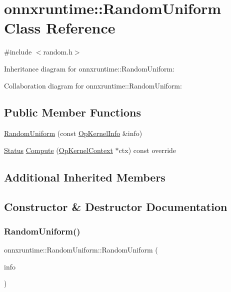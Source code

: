 \hypertarget{classonnxruntime_1_1RandomUniform}{}\section{onnxruntime\+:\+:Random\+Uniform Class Reference}
\label{classonnxruntime_1_1RandomUniform}


{\ttfamily \#include $<$random.\+h$>$}



Inheritance diagram for onnxruntime\+:\+:Random\+Uniform\+:


Collaboration diagram for onnxruntime\+:\+:Random\+Uniform\+:
\subsection*{Public Member Functions}
\begin{DoxyCompactItemize}
\item 
\mbox{\hyperlink{classonnxruntime_1_1RandomUniform_a239c67def4d44477f9b9de071d57bc5a}{Random\+Uniform}} (const \mbox{\hyperlink{classonnxruntime_1_1OpKernelInfo}{Op\+Kernel\+Info}} \&info)
\item 
\mbox{\hyperlink{classonnxruntime_1_1common_1_1Status}{Status}} \mbox{\hyperlink{classonnxruntime_1_1RandomUniform_a5a7d183518814aa5f09a31bb8188a290}{Compute}} (\mbox{\hyperlink{classonnxruntime_1_1OpKernelContext}{Op\+Kernel\+Context}} $\ast$ctx) const override
\end{DoxyCompactItemize}
\subsection*{Additional Inherited Members}


\subsection{Constructor \& Destructor Documentation}
\mbox{\label{classonnxruntime_1_1RandomUniform_a239c67def4d44477f9b9de071d57bc5a}} 
\subsubsection{\texorpdfstring{Random\+Uniform()}{RandomUniform()}}
{\footnotesize\ttfamily onnxruntime\+::\+Random\+Uniform\+::\+Random\+Uniform (\begin{DoxyParamCaption}\item[{const \mbox{\hyperlink{classonnxruntime_1_1OpKernelInfo}{Op\+Kernel\+Info}} \&}]{info }\end{DoxyParamCaption})\hspace{0.3cm}{\ttfamily [inline]}}



